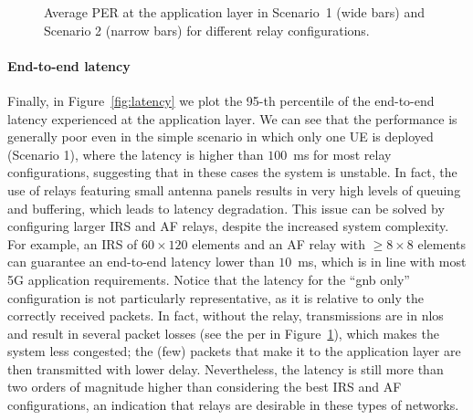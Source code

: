 \begin{figure}
	\centering
	\setlength{}
	\setlength{}
	
	\caption{Average PER at the application layer in Scenario~1 (wide bars) and Scenario 2 (narrow bars) for different relay configurations.}
	\label{fig:per}
\end{figure}

\paragraph{End-to-end latency}

Finally, in Figure~\ref{fig:latency} we plot the 95-th percentile of the end-to-end latency experienced at the application layer.
 We can see that the performance is generally poor even in the simple scenario in which only one UE is deployed (Scenario 1), where the latency is higher than $100$~ms for most relay configurations, suggesting that in these cases the system is unstable.  In fact, the use of relays featuring small antenna panels results in very high levels of queuing and buffering, which leads to latency degradation. This issue can be solved by configuring larger IRS and AF relays, despite the increased system complexity. 
 For example, an IRS of $60\times120$ elements and an AF relay with $\geq 8\times8$ elements can guarantee an end-to-end latency lower than $10$~ms, which is in line with most 5G application requirements. 
 Notice that the latency for the ``\gls{gnb} only'' configuration is not particularly representative, as it is relative to only the correctly received packets.
 In fact, without the relay, transmissions are in \gls{nlos} and result in several packet losses (see the \gls{per} in Figure~\ref{fig:per}), which makes the system less congested; the (few) packets that make it to the application layer are then transmitted with lower delay. Nevertheless, the latency is still more than two orders of magnitude higher than considering the best IRS and AF configurations, an indication that relays are desirable in these types of networks.


